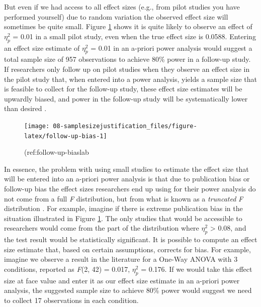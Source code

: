 \documentclass[
  oneside]{book}
\begin{document}
But even if we had access to all effect sizes (e.g., from pilot studies you have performed yourself) due to random variation the observed effect size will sometimes be quite small. Figure \ref{fig:follow-up-bias} shows it is quite likely to observe an effect of \(\eta_p^2\) = 0.01 in a small pilot study, even when the true effect size is 0.0588. Entering an effect size estimate of \(\eta_p^2\) = 0.01 in an a-priori power analysis would suggest a total sample size of 957 observations to achieve 80\% power in a follow-up study. If researchers only follow up on pilot studies when they observe an effect size in the pilot study that, when entered into a power analysis, yields a sample size that is feasible to collect for the follow-up study, these effect size estimates will be upwardly biased, and power in the follow-up study will be systematically lower than desired \citep{albers_when_2018}.



\begin{figure}

{\centering \texttt{[image: 08-samplesizejustification\_files/figure-latex/follow-up-bias-1]} 

}

\caption{(ref:follow-up-biaslab}\label{fig:follow-up-bias}
\end{figure}

In essence, the problem with using small studies to estimate the effect size that will be entered into an a-priori power analysis is that due to publication bias or follow-up bias the effect sizes researchers end up using for their power analysis do not come from a full \emph{F} distribution, but from what is known as a \emph{truncated} \emph{F} distribution \citep{taylor_bias_1996}. For example, imagine if there is extreme publication bias in the situation illustrated in Figure \ref{fig:follow-up-bias}. The only studies that would be accessible to researchers would come from the part of the distribution where \(\eta_p^2\) \textgreater{} 0.08, and the test result would be statistically significant. It is possible to compute an effect size estimate that, based on certain assumptions, corrects for bias. For example, imagine we observe a result in the literature for a One-Way ANOVA with 3 conditions, reported as \emph{F}(2, 42) = 0.017, \(\eta_p^2\) = 0.176. If we would take this effect size at face value and enter it as our effect size estimate in an a-priori power analysis, the suggested sample size to achieve 80\% power would suggest we need to collect 17 observations in each condition.
\end{document}
